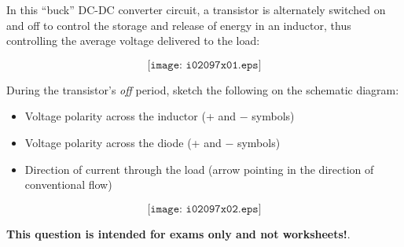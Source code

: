 

In this ``buck'' DC-DC converter circuit, a transistor is alternately switched on and off to control the storage and release of energy in an inductor, thus controlling the average voltage delivered to the load:

$$\texttt{[image: i02097x01.eps]}$$

During the transistor's {\it off} period, sketch the following on the schematic diagram:

\begin{itemize}
\item{} Voltage polarity across the inductor (+ and $-$ symbols)
\vskip 5pt
\item{} Voltage polarity across the diode (+ and $-$ symbols)
\vskip 5pt
\item{} Direction of current through the load (arrow pointing in the direction of conventional flow)
\end{itemize}







$$\texttt{[image: i02097x02.eps]}$$







{\bf This question is intended for exams only and not worksheets!}.


